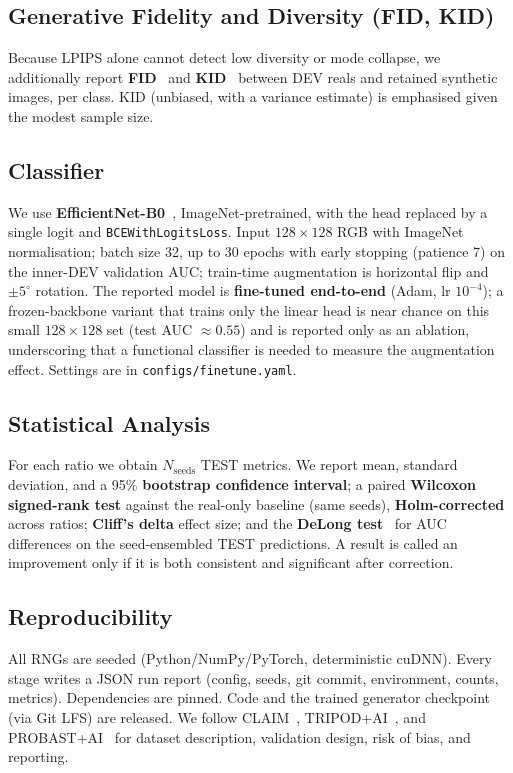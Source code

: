 \documentclass[runningheads]{llncs}
\begin{document}
\subsection{Generative Fidelity and Diversity (FID, KID)}
Because LPIPS alone cannot detect low diversity or mode collapse, we additionally
report \textbf{FID}~\cite{heusel2017fid} and \textbf{KID}~\cite{binkowski2018kid}
between DEV reals and retained synthetic images, per class. KID (unbiased, with a
variance estimate) is emphasised given the modest sample size.

\subsection{Classifier}
We use \textbf{EfficientNet-B0}~\cite{tan2019efficientnet}, ImageNet-pretrained,
with the head replaced by a single logit and \texttt{BCEWithLogitsLoss}. Input
$128\times128$ RGB with ImageNet normalisation; batch size 32, up to 30 epochs
with early stopping (patience 7) on the inner-DEV validation AUC; train-time
augmentation is horizontal flip and $\pm5^\circ$ rotation. The reported model is
\textbf{fine-tuned end-to-end} (Adam, lr $10^{-4}$); a frozen-backbone variant
that trains only the linear head is near chance on this small $128\times128$ set
(test AUC $\approx 0.55$) and is reported only as an ablation, underscoring that
a functional classifier is needed to measure the augmentation effect. Settings
are in \texttt{configs/finetune.yaml}.

\subsection{Statistical Analysis}
For each ratio we obtain $N_\text{seeds}$ TEST metrics. We report mean, standard
deviation, and a 95\% \textbf{bootstrap confidence interval}; a paired
\textbf{Wilcoxon signed-rank test} against the real-only baseline (same seeds),
\textbf{Holm-corrected} across ratios; \textbf{Cliff's delta} effect size; and
the \textbf{DeLong test}~\cite{delong1988} for AUC differences on the
seed-ensembled TEST predictions. A result is called an improvement only if it is
both consistent and significant after correction.

\subsection{Reproducibility}
All RNGs are seeded (Python/NumPy/PyTorch, deterministic cuDNN). Every stage
writes a JSON run report (config, seeds, git commit, environment, counts,
metrics). Dependencies are pinned. Code and the trained generator checkpoint
(via Git LFS) are released. We follow CLAIM~\cite{mongan2020claim},
TRIPOD+AI~\cite{collins2024tripodai}, and PROBAST+AI~\cite{moons2024probastai}
for dataset description, validation design, risk of bias, and reporting.
\end{document}
